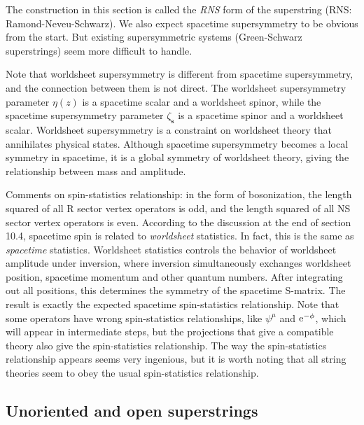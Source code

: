	The construction in this section is called the \emph{RNS} form of the superstring (RNS: Ramond-Neveu-Schwarz). We also expect spacetime supersymmetry to be obvious from the start. But existing supersymmetric systems (Green-Schwarz superstrings) seem more difficult to handle.
	
	Note that worldsheet supersymmetry is different from spacetime supersymmetry, and the connection between them is not direct. The worldsheet supersymmetry parameter $\eta(z)$ is a spacetime scalar and a worldsheet spinor, while the spacetime supersymmetry parameter $\zeta_{\mathbf{s}}$ is a spacetime spinor and a worldsheet scalar. Worldsheet supersymmetry is a constraint on worldsheet theory that annihilates physical states. Although spacetime supersymmetry becomes a local symmetry in spacetime, it is a global symmetry of worldsheet theory, giving the relationship between mass and amplitude. 
	
	Comments on spin-statistics relationship: in the form of bosonization, the length squared of all R sector vertex operators is odd, and the length squared of all NS sector vertex operators is even. According to the discussion at the end of section 10.4, spacetime spin is related to \emph{worldsheet} statistics. In fact, this is the same as \emph{spacetime} statistics. Worldsheet statistics controls the behavior of worldsheet amplitude under inversion, where inversion simultaneously exchanges worldsheet position, spacetime momentum and other quantum numbers. After integrating out all positions, this determines the symmetry of the spacetime S-matrix. The result is exactly the expected spacetime spin-statistics relationship. Note that some operators have wrong spin-statistics relationships, like $\psi^{\mu}$ and $\mathrm{e}^{-\phi}$, which will appear in intermediate steps, but the projections that give a compatible theory also give the spin-statistics relationship. The way the spin-statistics relationship appears seems very ingenious, but it is worth noting that all string theories seem to obey the usual spin-statistics relationship.  
	
	
	\subsection*{Unoriented and open superstrings}
	
